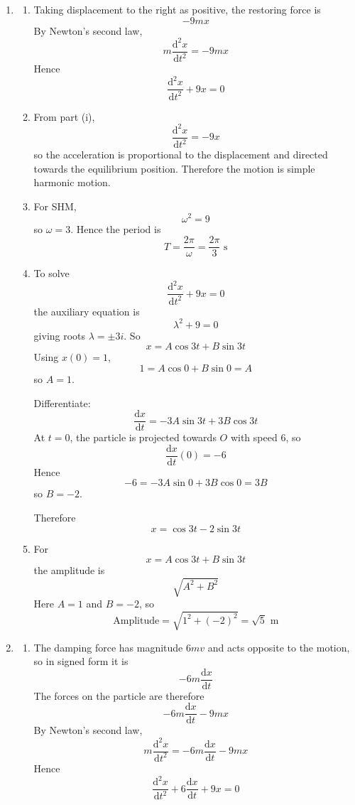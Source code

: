 \documentclass[leqno]{article}
\begin{document}
\begin{enumerate}[
  label=\textbf{\arabic*.},
  leftmargin=*,
  topsep=0pt,
  partopsep=0pt,
  parsep=0pt
]
\vspace*{30pt}

\begin{tcolorbox}[colback=white, colframe=scarlet, title={\textbf{Solution}}, breakable, grow to left by=6mm, grow to right by=10mm]
\begin{enumerate}[label=\textbf{(\alph*)}]
  \item
  \begin{enumerate}[label=(\roman*)]
    \item Taking displacement to the right as positive, the restoring force is
    \[
    -9mx
    \]
    By Newton's second law,
    \[
    m\frac{\mathrm{d}^2x}{\mathrm{d}t^2}=-9mx
    \]
    Hence
    \[
    \frac{\mathrm{d}^2x}{\mathrm{d}t^2}+9x=0
    \]

    \item From part (i),
    \[
    \frac{\mathrm{d}^2x}{\mathrm{d}t^2}=-9x
    \]
    so the acceleration is proportional to the displacement and directed towards the equilibrium position. Therefore the motion is simple harmonic motion.

    \item For SHM,
    \[
    \omega^2=9
    \]
    so \(\omega=3\). Hence the period is
    \[
    T=\frac{2\pi}{\omega}=\frac{2\pi}{3}\text{ s}
    \]

    \item To solve
    \[
    \frac{\mathrm{d}^2x}{\mathrm{d}t^2}+9x=0
    \]
    the auxiliary equation is
    \[
    \lambda^2+9=0
    \]
    giving roots \(\lambda=\pm 3i\). So
    \[
    x=A\cos 3t+B\sin 3t
    \]
    Using \(x(0)=1\),
    \[
    1=A\cos 0+B\sin 0=A
    \]
    so \(A=1\).

    Differentiate:
    \[
    \frac{\mathrm{d}x}{\mathrm{d}t}=-3A\sin 3t+3B\cos 3t
    \]
    At \(t=0\), the particle is projected towards \(O\) with speed \(6\), so
    \[
    \frac{\mathrm{d}x}{\mathrm{d}t}(0)=-6
    \]
    Hence
    \[
    -6=-3A\sin 0+3B\cos 0=3B
    \]
    so \(B=-2\).

    Therefore
    \[
    x=\cos 3t-2\sin 3t
    \]

    \item For
    \[
    x=A\cos 3t+B\sin 3t
    \]
    the amplitude is
    \[
    \sqrt{A^2+B^2}
    \]
    Here \(A=1\) and \(B=-2\), so
    \[
    \text{Amplitude}=\sqrt{1^2+(-2)^2}=\sqrt{5}\text{ m}
    \]
  \end{enumerate}

  \item
  \begin{enumerate}[label=(\roman*)]
    \item The damping force has magnitude \(6mv\) and acts opposite to the motion, so in signed form it is
    \[
    -6m\frac{\mathrm{d}x}{\mathrm{d}t}
    \]
    The forces on the particle are therefore
    \[
    -6m\frac{\mathrm{d}x}{\mathrm{d}t}-9mx
    \]
    By Newton's second law,
    \[
    m\frac{\mathrm{d}^2x}{\mathrm{d}t^2}=-6m\frac{\mathrm{d}x}{\mathrm{d}t}-9mx
    \]
    Hence
    \[
    \frac{\mathrm{d}^2x}{\mathrm{d}t^2}+6\frac{\mathrm{d}x}{\mathrm{d}t}+9x=0
    \]


\end{enumerate}
\end{enumerate}
\end{tcolorbox}
\end{enumerate}
\end{document}

